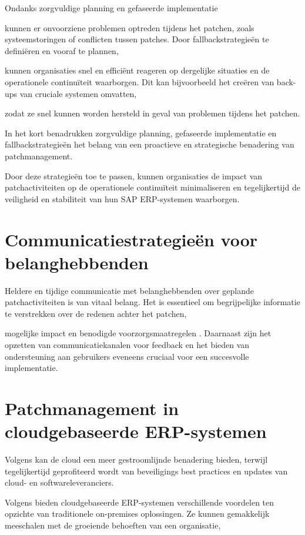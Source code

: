 Ondanks zorgvuldige planning en gefaseerde implementatie 

kunnen er onvoorziene problemen optreden tijdens het patchen, zoals systeemstoringen of conflicten tussen patches. Door fallbackstrategieën te definiëren en vooraf te plannen,

kunnen organisaties snel en efficiënt reageren op dergelijke situaties en de operationele continuïteit waarborgen. Dit kan bijvoorbeeld het creëren van back-ups van cruciale systemen omvatten, 

zodat ze snel kunnen worden hersteld in geval van problemen tijdens het patchen.

In het kort benadrukken zorgvuldige planning, gefaseerde implementatie en fallbackstrategieën het belang van een proactieve en strategische benadering van patchmanagement. 

Door deze strategieën toe te passen, kunnen organisaties de impact van patchactiviteiten op de operationele continuïteit minimaliseren en tegelijkertijd de veiligheid en stabiliteit van hun SAP ERP-systemen waarborgen.

\section{Communicatiestrategieën voor belanghebbenden}
Heldere en tijdige communicatie met belanghebbenden over geplande patchactiviteiten is van vitaal belang. Het is essentieel om begrijpelijke informatie te verstrekken over de redenen achter het patchen,

mogelijke impact en benodigde voorzorgsmaatregelen \autocite{Toren2019}. Daarnaast zijn het opzetten van communicatiekanalen voor feedback en het bieden van ondersteuning aan gebruikers eveneens cruciaal voor een succesvolle implementatie.


\section{Patchmanagement in cloudgebaseerde ERP-systemen}
Volgens \textcite{Forbes2021} kan de cloud een meer gestroomlijnde benadering bieden, terwijl tegelijkertijd geprofiteerd wordt van beveiligings best practices en updates van cloud- en softwareleveranciers. 

Volgens \textcite{Ruiter2024} bieden cloudgebaseerde ERP-systemen verschillende voordelen ten opzichte van traditionele on-premises oplossingen. Ze kunnen gemakkelijk meeschalen met de groeiende behoeften van een organisatie, 

